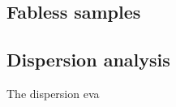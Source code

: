 \begin{figure}
	\centering
	
	\mycaption{}{}
	\label{fig:trans_cf}
\end{figure}

\begin{figure}
	\centering
	
	\mycaption{}{}
	\label{fig:QF_cf}
\end{figure}

\begin{figure}
	\centering
	
	\mycaption{}{}
	\label{fig:Qhist}
\end{figure}

\subsection{Fabless samples}



\subsection{Dispersion analysis}

The dispersion eva





